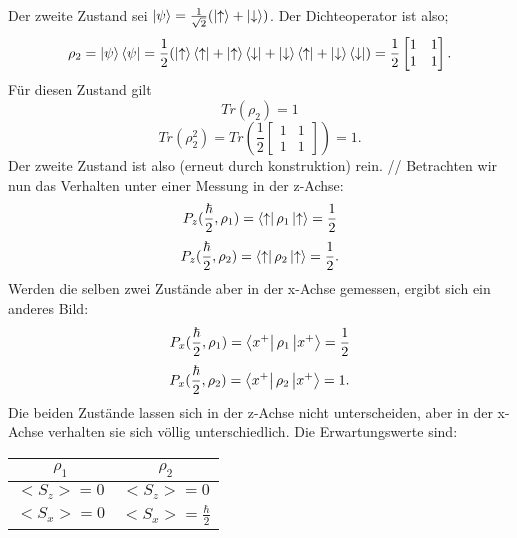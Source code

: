 \documentclass{report}
\begin{document}
Der zweite Zustand sei $\ket{\psi} = \frac{1}{\sqrt{2}} (\ket{\uparrow} + \ket{\downarrow} ) $. Der Dichteoperator ist also; \[
	\rho_2 = \ket{\psi}\bra{\psi} = \frac{1}{2} (\ket{\uparrow} \bra{\uparrow} + \ket{\uparrow} \bra{\downarrow} + \ket{\downarrow} \bra{\uparrow} + \ket{\downarrow} \bra{\downarrow}) = \frac{1}{2} \begin{bmatrix} 1 & 1 \\ 1 & 1 \end{bmatrix} 
.\] Für diesen Zustand gilt \[
Tr(\rho_2) = 1
\] \[
Tr(\rho_2^2) = Tr(\frac{1}{2} \begin{bmatrix} 1 & 1 \\ 1 & 1 \end{bmatrix}) = 1 
.\] Der zweite Zustand ist also (erneut durch konstruktion) rein. //
Betrachten wir nun das Verhalten unter einer Messung in der z-Achse:
\[
	P_z(\frac{\hbar}{2}, \rho_1) = \bra{\uparrow} \rho_1 \ket{\uparrow} = \frac{1}{2}  
\] \[
P_z(\frac{\hbar}{2}, \rho_2) = \bra{\uparrow} \rho_2 \ket{\uparrow} = \frac{1}{2}
.\] Werden die selben zwei Zustände aber in der x-Achse gemessen, ergibt sich ein anderes Bild: \[
P_x(\frac{\hbar}{2}, \rho_1) = \bra{x^+} \rho_1 \ket{x^+} = \frac{1}{2} 
\] \[
P_x(\frac{\hbar}{2}, \rho_2) = \bra{x^+}  \rho_2 \ket{x^+} = 1 
.\] Die beiden Zustände lassen sich in der z-Achse nicht unterscheiden, aber in der x-Achse verhalten sie sich völlig unterschiedlich. Die Erwartungswerte sind: 
\begin{center}
	\begin{tabular}{c c}
		$\rho_1$ & $\rho_2$ \\
		\hline
		$<S_z> = 0$ &  $<S_z> = 0$ \\
		$<S_x> = 0$ &  $<S_x> = \frac{\hbar}{2}$ 
	\end{tabular}
\end{center}
\end{document}
